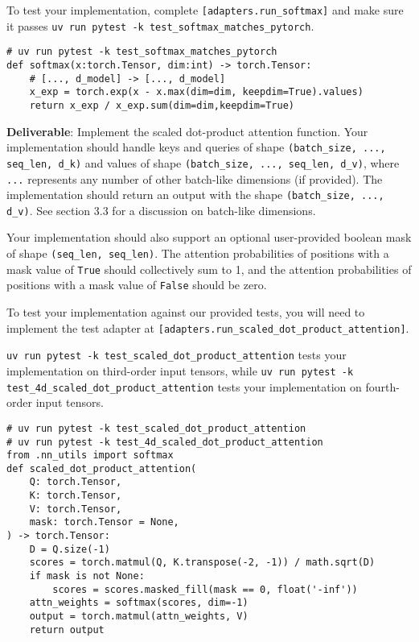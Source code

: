 To test your implementation, complete \texttt{[adapters.run\_softmax]} and make sure it passes \texttt{uv run pytest -k test\_softmax\_matches\_pytorch}.

\begin{lstlisting}
# uv run pytest -k test_softmax_matches_pytorch
def softmax(x:torch.Tensor, dim:int) -> torch.Tensor:
    # [..., d_model] -> [..., d_model]
    x_exp = torch.exp(x - x.max(dim=dim, keepdim=True).values)
    return x_exp / x_exp.sum(dim=dim,keepdim=True)
\end{lstlisting}


\textbf{Deliverable}: Implement the scaled dot-product attention function. Your implementation should handle keys and queries of shape \lstinline{(batch_size, ..., seq_len, d_k)} and values of shape \lstinline{(batch_size, ..., seq_len, d_v)}, where \lstinline{...} represents any number of other batch-like dimensions (if provided). The implementation should return an output with the shape \lstinline{(batch_size, ..., d_v)}. See section 3.3 for a discussion on batch-like dimensions.

Your implementation should also support an optional user-provided boolean mask of shape \lstinline{(seq_len, seq_len)}. The attention probabilities of positions with a mask value of \lstinline{True} should collectively sum to 1, and the attention probabilities of positions with a mask value of \lstinline{False} should be zero.

To test your implementation against our provided tests, you will need to implement the test adapter at \texttt{[adapters.run\_scaled\_dot\_product\_attention]}.

\texttt{uv run pytest -k test\_scaled\_dot\_product\_attention} tests your implementation on third-order input tensors, while \texttt{uv run pytest -k test\_4d\_scaled\_dot\_product\_attention} tests your implementation on fourth-order input tensors.

\begin{lstlisting}
# uv run pytest -k test_scaled_dot_product_attention
# uv run pytest -k test_4d_scaled_dot_product_attention
from .nn_utils import softmax
def scaled_dot_product_attention(
    Q: torch.Tensor,
    K: torch.Tensor,
    V: torch.Tensor,
    mask: torch.Tensor = None,
) -> torch.Tensor:
    D = Q.size(-1)
    scores = torch.matmul(Q, K.transpose(-2, -1)) / math.sqrt(D)
    if mask is not None:
        scores = scores.masked_fill(mask == 0, float('-inf'))
    attn_weights = softmax(scores, dim=-1)
    output = torch.matmul(attn_weights, V)
    return output
\end{lstlisting}

